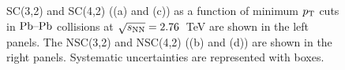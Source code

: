 \begin{figure}[t!]
	\begin{center}
        \caption{SC(3,2) and SC(4,2) ((a) and (c)) as a function of minimum $p_{\rm T}$ cuts in $\textnormal{Pb--Pb}$ collisions at $\sqrt{s_{\textnormal{NN}}}=2.76$~TeV are shown in the left panels. The NSC(3,2) and NSC(4,2) ((b) and (d)) are shown in the right panels. Systematic uncertainties are represented with boxes.}         \label{fig:Figure_2}
        \end{center}   
\end{figure}

